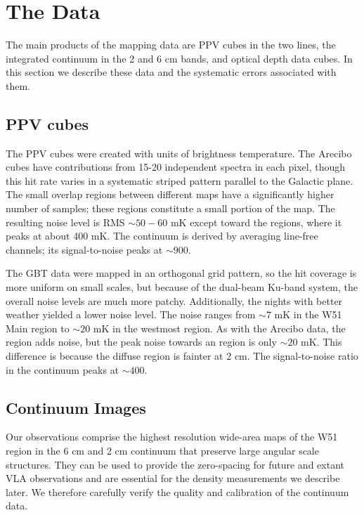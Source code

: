 \section{The Data}

The main products of the mapping data are PPV cubes in the two \formaldehyde
lines, the integrated continuum in the 2 and 6 cm bands, and optical depth data
cubes.  In this section we describe these data and the systematic errors
associated with them.  

\subsection{PPV cubes}
\label{sec:ppvcubes}
The PPV cubes were created with units of brightness temperature.  The Arecibo
cubes have contributions from 15-20 independent spectra in each pixel, though
this hit rate varies in a systematic striped pattern parallel to the Galactic
plane.  The small overlap regions between different maps have a significantly
higher number of samples; these regions constitute a small portion of the map.
The resulting noise level is RMS $\sim 50-60$ mK except toward the \hii
regions, where it peaks at about 400 mK.  The continuum is derived by averaging
line-free channels; its signal-to-noise peaks at $\sim900$.

The GBT data were mapped in an orthogonal grid pattern, so the hit coverage is
more uniform on small scales, but because of the dual-beam Ku-band system, the
overall noise levels are much more patchy.  Additionally, the nights with
better weather yielded a lower noise level.  The noise ranges from $\sim7$ mK
in the W51 Main region to $\sim 20$ mK in the westmost region.  As with the
Arecibo data, the \hii region adds noise, but the peak noise towards an \hii
region is only $\sim 20$ mK.  This difference is because the diffuse \hii
region is fainter at 2 cm.  The signal-to-noise ratio in the continuum peaks at
$\sim 400$.

\subsection{Continuum Images}
Our observations comprise the highest resolution wide-area maps of the W51
region in the 6 cm and 2 cm continuum that preserve large angular scale
structures.  They can be used to provide the zero-spacing for future and extant
VLA observations and are essential for the density measurements we describe
later.  We therefore carefully verify the quality and calibration of the
continuum data.

